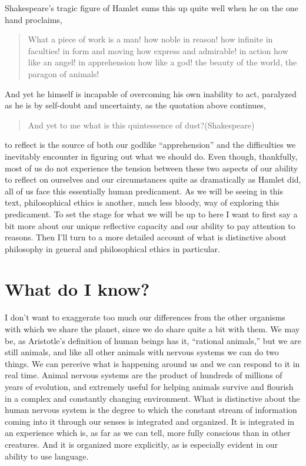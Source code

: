 \documentclass[justified]{tufte-book}
\begin{document}
Shakespeare's tragic figure of Hamlet sums this up quite well when he on the one hand proclaims,

\begin{quote}
What a piece of work is a man! how noble in reason! how infinite in faculties! in form and moving how express and admirable! in action how like an angel! in apprehension how like a god! the beauty of the world, the paragon of animals!
\end{quote}

And yet he himself is incapable of overcoming his own inability to act, paralyzed as he is by self-doubt and uncertainty, as the quotation above continues,

\begin{quote}
And yet to me what is this quintessence of dust?(Shakespeare)
\end{quote}

 to reflect is the source of both our godlike ``apprehension'' and the difficulties we inevitably encounter in figuring out what we should do. Even though, thankfully, most of us do not experience the tension between these two aspects of our ability to reflect on ourselves and our circumstances quite as dramatically as Hamlet did, all of us face this essentially human predicament. As we will be seeing in this text, philosophical ethics is another, much less bloody, way of exploring this predicament. To set the stage for what we will be up to here I want to first say a bit more about our unique reflective capacity and our ability to pay attention to reasons. Then I'll turn to a more detailed account of what is distinctive about philosophy in general and philosophical ethics in particular.

\hypertarget{what-do-i-know}{%
\section{What do I know?}\label{what-do-i-know}}

 I don't want to exaggerate too much our differences from the other organisms with which we share the planet, since we do share quite a bit with them. We may be, as Aristotle's definition of human beings has it, ``rational animals,'' but we are still animals, and like all other animals with nervous systems we can do two things. We can perceive what is happening around us and we can respond to it in real time. Animal nervous systems are the product of hundreds of millions of years of evolution, and extremely useful for helping animals survive and flourish in a complex and constantly changing environment. What is distinctive about the human nervous system is the degree to which the constant stream of information coming into it through our senses is integrated and organized. It is integrated in an experience which is, as far as we can tell, more fully conscious than in other creatures. And it is organized more explicitly, as is especially evident in our ability to use language.
\end{document}
